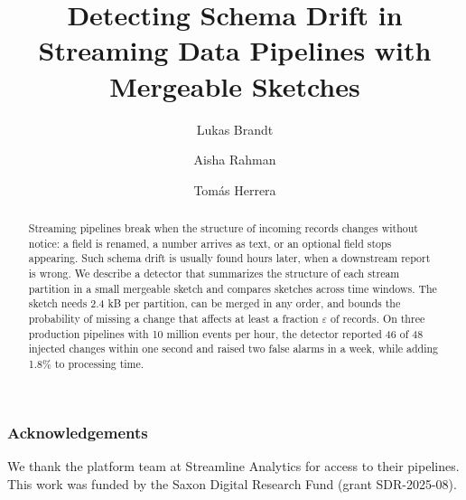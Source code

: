 \documentclass[runningheads]{llncs}
\begin{document}
\title{Detecting Schema Drift in Streaming Data Pipelines with Mergeable Sketches}

\author{Lukas Brandt \and
Aisha Rahman \and
Tom\'as Herrera}


\maketitle

\begin{abstract}
Streaming pipelines break when the structure of incoming records changes without notice: a field is renamed, a number arrives as text, or an optional field stops appearing. Such schema drift is usually found hours later, when a downstream report is wrong. We describe a detector that summarizes the structure of each stream partition in a small mergeable sketch and compares sketches across time windows. The sketch needs 2.4 kB per partition, can be merged in any order, and bounds the probability of missing a change that affects at least a fraction $\varepsilon$ of records. On three production pipelines with 10 million events per hour, the detector reported 46 of 48 injected changes within one second and raised two false alarms in a week, while adding 1.8\% to processing time.

\end{abstract}







\subsubsection*{Acknowledgements}
We thank the platform team at Streamline Analytics for access to their pipelines. This work was funded by the Saxon Digital Research Fund (grant SDR-2025-08).



\end{document}
